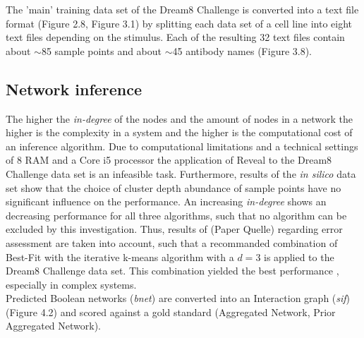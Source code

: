 The 'main' training data set of the Dream8 Challenge is converted into a text file format (Figure 2.8, Figure 3.1) by splitting each data set of a cell line into eight text files depending on the stimulus. Each of the resulting 32 text files contain about $\sim $85 sample points and about $\sim $45 antibody names (Figure 3.8).\\

\subsection*{Network inference}
The higher the \textit{in-degree} of the nodes and the amount of nodes in a network the higher is the complexity in a system and the higher is the computational cost of an inference algorithm. Due to computational limitations and a technical settings of 8 RAM and a Core i5 processor the application of Reveal to the Dream8 Challenge data set is an infeasible task. 
Furthermore, results of the \textit{in silico} data set show that the choice of cluster depth abundance of sample points have no significant influence on the performance. An increasing \textit{in-degree} shows an decreasing performance for all three algorithms, such that no algorithm can be excluded by this investigation. Thus, results of (Paper Quelle) regarding error assessment are taken into account, such that a recommanded combination of Best-Fit with the iterative k-means algorithm with a $d=3$ is applied to the Dream8 Challenge data set. This combination yielded the best performance , especially in complex systems.\\
Predicted Boolean networks (\textit{bnet}) are converted into an Interaction graph (\textit{sif}) (Figure 4.2) and scored against a gold standard (Aggregated Network, Prior Aggregated Network). 

